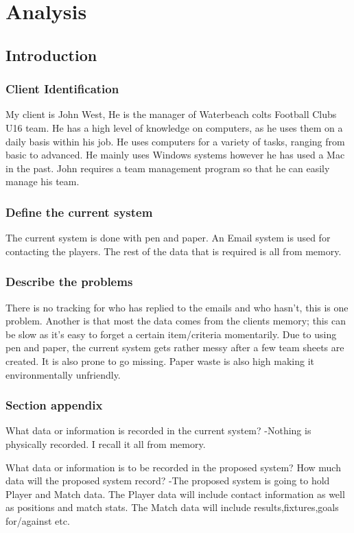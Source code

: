 \chapter{Analysis}

\section{Introduction}

\subsection{Client Identification}
My client is John West, He is the manager of Waterbeach colts Football Clubs U16 team.  He has a high level of knowledge on computers, as he uses them on a daily basis within his job. He uses computers for a variety of tasks, ranging from basic to advanced. He mainly uses Windows systems however he has used a Mac in the past. John requires a team management program so that he can easily manage his team.
\subsection{Define the current system}
The current system is done with pen and paper. An Email system is used for contacting the players. The rest of the data that is required is all from memory.
\subsection{Describe the problems}
There is no tracking for who has replied to the emails and who hasn't, this is one problem.  Another is that most the data comes from the clients memory; this can be slow as it's easy to forget a certain item/criteria momentarily. Due to using pen and paper, the current system gets rather messy after a few team sheets are created. It is also prone to go missing. Paper waste is also high making it environmentally unfriendly.

\subsection{Section appendix}
What data or information is recorded in the current system?
-Nothing is physically recorded. I recall it all from memory.

What data or information is to be recorded in the proposed system? How much data will the proposed system record?
-The proposed system is going to hold Player and Match data. The Player data will 
include contact information as well as positions and match stats. The Match data will include results,fixtures,goals for/against etc.

